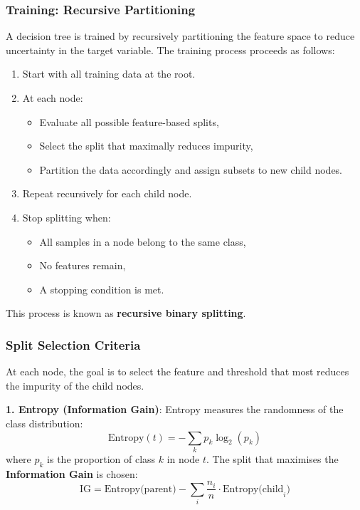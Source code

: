 \documentclass[9pt]{extarticle}
\begin{document}
\subsubsection*{Training: Recursive Partitioning}

A decision tree is trained by recursively partitioning the feature space to reduce uncertainty in the target variable. The training process proceeds as follows:

\begin{enumerate}
    \item Start with all training data at the root.
    \item At each node:
    \begin{itemize}
        \item Evaluate all possible feature-based splits,
        \item Select the split that maximally reduces impurity,
        \item Partition the data accordingly and assign subsets to new child nodes.
    \end{itemize}
    \item Repeat recursively for each child node.
    \item Stop splitting when:
    \begin{itemize}
        \item All samples in a node belong to the same class,
        \item No features remain,
        \item A stopping condition is met.
    \end{itemize}
\end{enumerate}
This process is known as \textbf{recursive binary splitting}.

\subsubsection*{Split Selection Criteria}

At each node, the goal is to select the feature and threshold that most reduces the impurity of the child nodes.

\textbf{1. Entropy (Information Gain)}:  
Entropy measures the randomness of the class distribution:
\[
\text{Entropy}(t) = -\sum_{k} p_k \log_2(p_k)
\]
where $p_k$ is the proportion of class $k$ in node $t$. The split that maximises the \textbf{Information Gain} is chosen:
\[
\text{IG} = \text{Entropy(parent)} - \sum_i \frac{n_i}{n} \cdot 
\text{Entropy(child}_i)
\]
\end{document}
